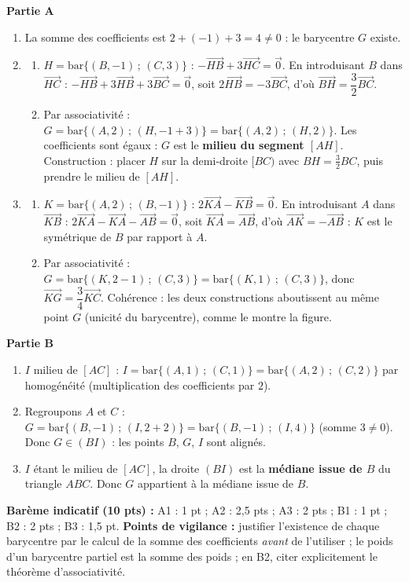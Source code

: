 \documentclass[11pt]{article}
\begin{document}
\begin{corrige}
\textbf{Partie A}
\begin{enumerate}
\item La somme des coefficients est $2+(-1)+3=4\neq 0$ : le barycentre $G$ existe.
\item \begin{enumerate}
\item $H=\mathrm{bar}\{(B,-1)\,;\,(C,3)\}$ : $-\overrightarrow{HB}+3\overrightarrow{HC}=\vec{0}$. En introduisant $B$ dans $\overrightarrow{HC}$ : $-\overrightarrow{HB}+3\overrightarrow{HB}+3\overrightarrow{BC}=\vec{0}$, soit $2\overrightarrow{HB}=-3\overrightarrow{BC}$, d'où $\overrightarrow{BH}=\dfrac{3}{2}\overrightarrow{BC}$.
\item Par associativité : $G=\mathrm{bar}\{(A,2)\,;\,(H,-1+3)\}=\mathrm{bar}\{(A,2)\,;\,(H,2)\}$. Les coefficients sont égaux : $G$ est le \textbf{milieu du segment $[AH]$}. Construction : placer $H$ sur la demi-droite $[BC)$ avec $BH=\frac32 BC$, puis prendre le milieu de $[AH]$.
\end{enumerate}
\item \begin{enumerate}
\item $K=\mathrm{bar}\{(A,2)\,;\,(B,-1)\}$ : $2\overrightarrow{KA}-\overrightarrow{KB}=\vec{0}$. En introduisant $A$ dans $\overrightarrow{KB}$ : $2\overrightarrow{KA}-\overrightarrow{KA}-\overrightarrow{AB}=\vec{0}$, soit $\overrightarrow{KA}=\overrightarrow{AB}$, d'où $\overrightarrow{AK}=-\overrightarrow{AB}$ : $K$ est le symétrique de $B$ par rapport à $A$.
\item Par associativité : $G=\mathrm{bar}\{(K,2-1)\,;\,(C,3)\}=\mathrm{bar}\{(K,1)\,;\,(C,3)\}$, donc $\overrightarrow{KG}=\dfrac{3}{4}\overrightarrow{KC}$. Cohérence : les deux constructions aboutissent au même point $G$ (unicité du barycentre), comme le montre la figure.
\end{enumerate}
\end{enumerate}
\textbf{Partie B}
\begin{enumerate}
\item $I$ milieu de $[AC]$ : $I=\mathrm{bar}\{(A,1)\,;\,(C,1)\}=\mathrm{bar}\{(A,2)\,;\,(C,2)\}$ par homogénéité (multiplication des coefficients par $2$).
\item Regroupons $A$ et $C$ : $G=\mathrm{bar}\{(B,-1)\,;\,(I,2+2)\}=\mathrm{bar}\{(B,-1)\,;\,(I,4)\}$ (somme $3\neq 0$). Donc $G\in(BI)$ : les points $B$, $G$, $I$ sont alignés.
\item $I$ étant le milieu de $[AC]$, la droite $(BI)$ est la \textbf{médiane issue de $B$} du triangle $ABC$. Donc $G$ appartient à la médiane issue de $B$.
\end{enumerate}
\textbf{Barème indicatif (10 pts) :} A1 : 1 pt ; A2 : 2,5 pts ; A3 : 2 pts ; B1 : 1 pt ; B2 : 2 pts ; B3 : 1,5 pt.
\textbf{Points de vigilance :} justifier l'existence de chaque barycentre par le calcul de la somme des coefficients \emph{avant} de l'utiliser ; le poids d'un barycentre partiel est la somme des poids ; en B2, citer explicitement le théorème d'associativité.
\end{corrige}
\end{document}

